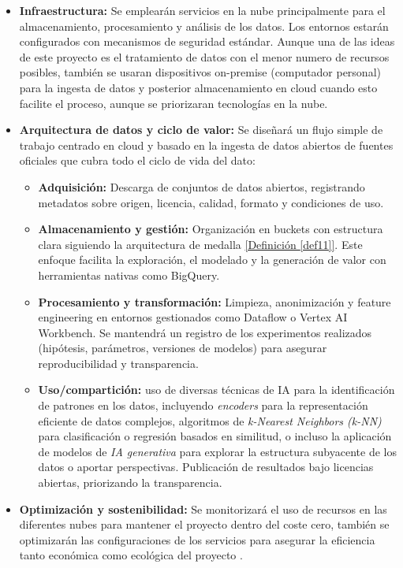 \begin{itemize}
	\item \textbf{Infraestructura:} Se emplearán servicios en la nube principalmente para el almacenamiento, procesamiento y análisis de los datos. Los entornos estarán configurados con mecanismos de seguridad estándar. Aunque una de las ideas de este proyecto es el tratamiento de datos con el menor numero de recursos posibles, también se usaran dispositivos on-premise (computador personal) para la ingesta de datos y posterior almacenamiento en cloud cuando esto facilite el proceso, aunque se priorizaran tecnologías en la nube.

	\item \textbf{Arquitectura de datos y ciclo de valor:} Se diseñará un flujo simple de trabajo centrado en cloud y basado en la ingesta de datos abiertos de fuentes oficiales que cubra todo el ciclo de vida del dato: 
	\begin{itemize}
		\item \textbf{Adquisición:} Descarga de conjuntos de datos abiertos, registrando metadatos sobre origen, licencia, calidad, formato y condiciones de uso. 
		
		\item \textbf{Almacenamiento y gestión:} Organización en buckets con estructura clara siguiendo la arquitectura de medalla \hyperref[def11]{[Definición \ref*{def11}]}. Este enfoque facilita la exploración, el modelado y la generación de valor con herramientas nativas como BigQuery.
		
		\item \textbf{Procesamiento y transformación:} Limpieza, anonimización y feature engineering en entornos gestionados como Dataflow o Vertex AI Workbench. Se mantendrá un registro de los experimentos realizados (hipótesis, parámetros, versiones de modelos) para asegurar reproducibilidad y transparencia.
		
		\item \textbf{Uso/compartición:} uso de diversas técnicas de IA para la identificación de patrones en los datos, incluyendo \textit{encoders} para la representación eficiente de datos complejos, algoritmos de \textit{k-Nearest Neighbors (k-NN)} para clasificación o regresión basados en similitud, o incluso la aplicación de modelos de \textit{IA generativa} para explorar la estructura subyacente de los datos o aportar perspectivas. Publicación de resultados bajo licencias abiertas, priorizando la transparencia.
		
	\end{itemize}
	
	\item \textbf{Optimización y sostenibilidad:} Se monitorizará el uso de recursos en las diferentes nubes para mantener el proyecto dentro del coste cero, también se optimizarán las configuraciones de los servicios para asegurar la eficiencia tanto económica como ecológica del proyecto .
\end{itemize}

